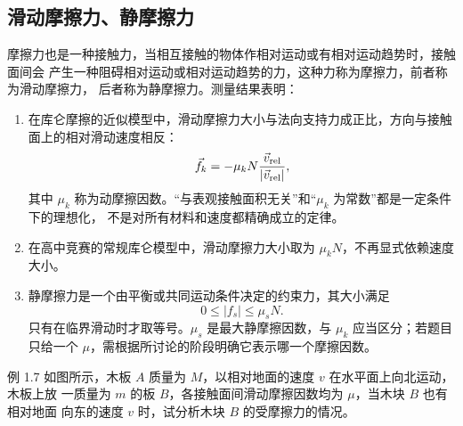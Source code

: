 \documentclass[UTF8,zihao=-4,oneside,openany]{ctexbook}
\begin{document}
\subsection{滑动摩擦力、静摩擦力}

摩擦力也是一种接触力，当相互接触的物体作相对运动或有相对运动趋势时，接触面间会
产生一种阻碍相对运动或相对运动趋势的力，这种力称为摩擦力，前者称为滑动摩擦力，
后者称为静摩擦力。测量结果表明：

\begin{enumerate}[label=\arabic*.]
  \item 在库仑摩擦的近似模型中，滑动摩擦力大小与法向支持力成正比，方向与接触面上的相对滑动速度相反：
  \begin{equation}
    \vec f_k=-\mu_kN\frac{\vec v_{\rm rel}}{|\vec v_{\rm rel}|},
  \end{equation}
  其中 $\mu_k$ 称为动摩擦因数。“与表观接触面积无关”和“$\mu_k$ 为常数”都是一定条件下的理想化，
  不是对所有材料和速度都精确成立的定律。

  \item 在高中竞赛的常规库仑模型中，滑动摩擦力大小取为 $\mu_kN$，不再显式依赖速度大小。

  \item 静摩擦力是一个由平衡或共同运动条件决定的约束力，其大小满足
  \begin{equation}
    0\le |f_s|\le \mu_sN.
  \end{equation}
  只有在临界滑动时才取等号。$\mu_s$ 是最大静摩擦因数，与 $\mu_k$ 应当区分；若题目只给一个
  $\mu$，需根据所讨论的阶段明确它表示哪一个摩擦因数。
\end{enumerate}

\begin{origexamplebox}{例 1.7}
如图所示，木板 $A$ 质量为 $M$，以相对地面的速度 $v$ 在水平面上向北运动，木板上放
一质量为 $m$ 的板 $B$，各接触面间滑动摩擦因数均为 $\mu$，当木块 $B$ 也有相对地面
向东的速度 $v$ 时，试分析木块 $B$ 的受摩擦力的情况。

\begin{center}
\end{center}
\end{origexamplebox}
\end{document}
